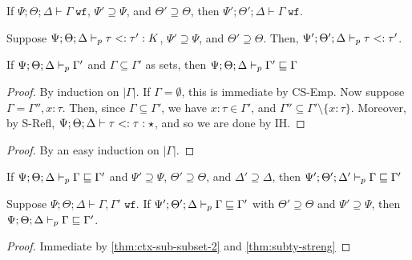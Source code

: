 \begin{theorem}
If $\Psi ; \Theta ; \Delta \vdash \Gamma \; \texttt{wf}$, $\Psi' \supseteq \Psi$, and $\Theta' \supseteq \Theta$, then
$\Psi' ; \Theta' ; \Delta \vdash \Gamma \; \texttt{wf}$.
\end{theorem}

\typeidxsubst*


\begin{theorem}
Suppose $\Psi ; \Theta ; \Delta \vdash_p \tau <: \tau' : K$, $\Psi' \supseteq \Psi$, and $\Theta' \supseteq \Theta$.
Then, $\Psi' ; \Theta' ; \Delta \vdash_p \tau <: \tau'$.
\end{theorem}

\subtystreng*


\begin{theorem}
If $\Psi ; \Theta ; \Delta \vdash_p \Gamma'$ and $\Gamma \subseteq \Gamma'$ as sets, then $\Psi ; \Theta ; \Delta \vdash_p \Gamma' \sqsubseteq \Gamma$
\label{thm:ctx-sub-subset1}
\end{theorem}
\begin{proof}
By induction on $|\Gamma|$.
If $\Gamma = \emptyset$, this is immediate by CS-Emp.
Now suppose $\Gamma = \Gamma'', x : \tau$. Then, since $\Gamma \subseteq \Gamma'$, we have $x : \tau \in \Gamma'$, and $\Gamma'' \subseteq \Gamma' \setminus \{x : \tau\}$. Moreover, by S-Refl, $\Psi ; \Theta ; \Delta \vdash \tau <: \tau : \star$, and so we are done by IH.
\end{proof}

\ctxsubsubset*
\begin{proof}
By an easy induction on $|\Gamma|$.
\end{proof}

\begin{theorem}
If $\Psi ; \Theta ; \Delta \vdash_p \Gamma \sqsubseteq \Gamma'$ and $\Psi' \supseteq \Psi$, $\Theta' \supseteq \Theta$, and $\Delta' \supseteq \Delta$, then
$\Psi' ; \Theta' ; \Delta' \vdash_p \Gamma \sqsubseteq \Gamma'$
\label{thm:ctx-sub-wkn}
\end{theorem}

\begin{theorem}
Suppose $\Psi ; \Theta ; \Delta \vdash \Gamma,\Gamma' \texttt{ wf}$.
If $\Psi' ; \Theta' ; \Delta \vdash_p \Gamma \sqsubseteq \Gamma'$ with $\Theta' \supseteq \Theta$ and $\Psi' \supseteq \Psi$, then $\Psi ; \Theta ; \Delta \vdash_p \Gamma \sqsubseteq \Gamma'$.
\end{theorem}
\label{thm:ctx-sub-streng}
\begin{proof}
Immediate by \autoref{thm:ctx-sub-subset-2} and \autoref{thm:subty-streng}
\end{proof}

